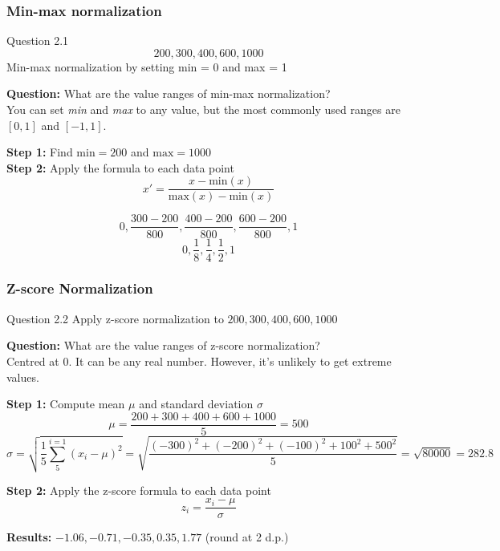 \documentclass[aspectratio=169, 10pt]{beamer}
\begin{document}

\begin{frame}[t]
    \frametitle{Min-max normalization}
    \small

    \begin{block}{Question 2.1}
        \[200, 300, 400, 600, 1000\]
        Min-max normalization by setting min = 0 and max = 1
    \end{block}

    \textbf{Question:} What are the value ranges of min-max normalization?\\
    You can set \textit{min} and \textit{max} to any value, but the most commonly used ranges are $[0, 1]$ and $[-1, 1]$.\\

    \vspace{1em}

    \textbf{Step 1:} Find $\text{min}=200$ and $\text{max}=1000$\\
    \textbf{Step 2:} Apply the formula to each data point
    \[x' = \frac{x - \text{min}(x)}{ \text{max}(x) - \text{min}(x)}\]

    \[0, \frac{300-200}{800}, \frac{400-200}{800}, \frac{600-200}{800}, 1\]
    \[0, \frac{1}{8}, \frac{1}{4}, \frac{1}{2}, 1\]

\end{frame}


\begin{frame}[t]
    \frametitle{Z-score Normalization}
    \small

    \begin{block}{Question 2.2}
        Apply z-score normalization to $200, 300, 400, 600, 1000$
    \end{block}

    \textbf{Question:} What are the value ranges of z-score normalization?\\
    Centred at 0. It can be any real number. However, it's unlikely to get extreme values.\\

    \vspace{1em}

    \textbf{Step 1:} Compute mean $\mu$ and standard deviation $\sigma$
    \[\mu = \frac{200+300+400+600+1000}{5}=500\]
    \[\sigma = \sqrt{\frac{1}{5}\sum_{5}^{i=1}(x_i-\mu)^2} = \sqrt{\frac{(-300)^2 + (-200)^2 + (-100)^2 + 100^2 + 500^2}{5}}= \sqrt{80000}=282.8\]

    \textbf{Step 2:} Apply the z-score formula to each data point
    \[z_i = \frac{x_i - \mu}{ \sigma}\]

    \textbf{Results:} $-1.06, -0.71, -0.35, 0.35, 1.77$ (round at 2 d.p.)
    
\end{frame}
\end{document}
